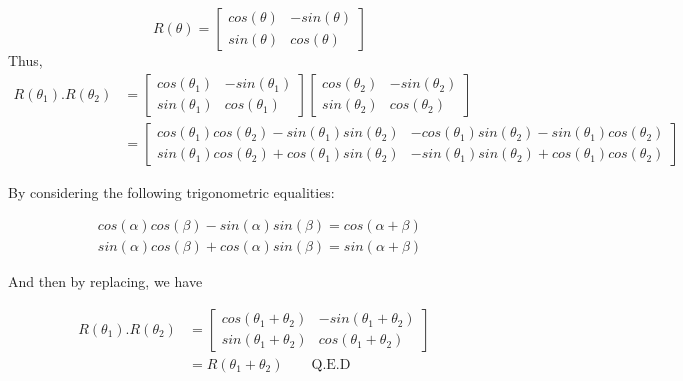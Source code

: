 \documentclass[a4paper,10pt]{article}
\begin{document}
\begin{equation}
R(\theta) =
\begin{bmatrix}
	cos(\theta) & -sin(\theta)\\
	sin(\theta) & cos(\theta)
\end{bmatrix}
\end{equation}
\noindent
Thus,
\begin{equation}
\left.\begin{aligned}
R(\theta_1).R(\theta_2)&=
\begin{bmatrix}
	cos(\theta_1) & -sin(\theta_1)\\
	sin(\theta_1) & cos(\theta_1)
\end{bmatrix}
\begin{bmatrix}
	cos(\theta_2) & -sin(\theta_2)\\
	sin(\theta_2) & cos(\theta_2)
\end{bmatrix}&\\
&= \begin{bmatrix}
	cos(\theta_1)cos(\theta_2) - sin(\theta_1)sin(\theta_2) & -cos(\theta_1)sin(\theta_2) - sin(\theta_1)cos(\theta_2)\\
	sin(\theta_1)cos(\theta_2) + cos(\theta_1)sin(\theta_2) & -sin(\theta_1)sin(\theta_2) + cos(\theta_1)cos(\theta_2)
\end{bmatrix}&
\end{aligned}\right.
\end{equation}

\bigskip \noindent
By considering the following trigonometric equalities:

\begin{equation}
\left.\begin{aligned}
&cos(\alpha)cos(\beta) - sin(\alpha)sin(\beta) = cos(\alpha + \beta)&\\
&sin(\alpha)cos(\beta) + cos(\alpha)sin(\beta) = sin(\alpha + \beta)&
\end{aligned}\right.
\end{equation}

\bigskip \noindent
And then by replacing, we have

\begin{equation}
\left.\begin{aligned}
R(\theta_1).R(\theta_2)&=
\begin{bmatrix}
	cos(\theta_1 + \theta_2) & -sin(\theta_1 + \theta_2)\\
	sin(\theta_1 + \theta_2) & cos(\theta_1 + \theta_2)
\end{bmatrix}&\\
&= R(\theta_1 + \theta_2) \qquad \text{Q.E.D}&\\
\end{aligned}\right.
\end{equation}
\end{document}
